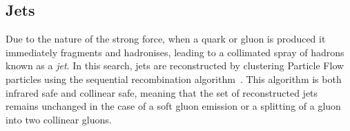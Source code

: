 



\subsection{Jets}
\label{sec:detector-jets}





Due to the nature of the strong force, when a quark or gluon is produced it 
immediately fragments and hadronises, leading to a collimated spray of hadrons 
known as a \textit{jet}. In this search, jets are reconstructed by clustering 
Particle Flow particles using the \antikt sequential recombination 
algorithm~\cite{antikt}. This algorithm is both infrared safe and collinear 
safe, 
meaning that the set of reconstructed jets remains unchanged in the case of a 
soft gluon emission or a splitting of a gluon into two collinear gluons. 

